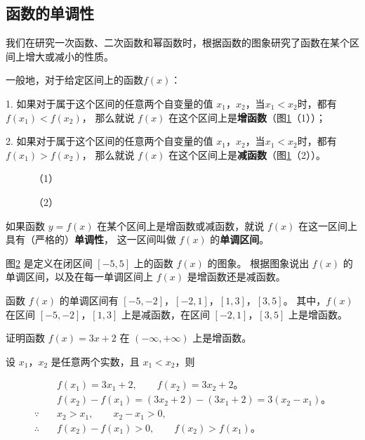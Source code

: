 \subsection{函数的单调性}

我们在研究一次函数、二次函数和幂函数时，根据函数的图象研究了函数在某个区间上增大或减小的性质。

一般地，对于给定区间上的函数$f(x)$：

1. 如果对于属于这个区间的任意两个自变量的值 $x_1$，$x_2$，当$x_1 < x_2$时，都有$f(x_1) < f(x_2)$，
那么就说 $f(x)$ 在这个区间上是\textbf{增函数}（图\ref{fig:1-18}（1））；

2. 如果对于属于这个区间的任意两个自变量的值 $x_1$，$x_2$，当$x_1 < x_2$时，都有$f(x_1) > f(x_2)$，
那么就说 $f(x)$ 在这个区间上是\textbf{减函数}（图\ref{fig:1-18}（2））。

\begin{figure}[htbp]
    \centering
    \begin{minipage}{7cm}
    \centering
    
    \caption*{（1）}
    \end{minipage}
    \qquad
    \begin{minipage}{7cm}
    \centering
    
    \caption*{（2）}
    \end{minipage}
    \caption{}\label{fig:1-18}
\end{figure}

如果函数 $y = f(x)$ 在某个区间上是增函数或减函数，就说 $f(x)$ 在这一区间上具有（严格的）\textbf{单调性}，
这一区间叫做 $f(x)$ 的\textbf{单调区间}。

\liti 图\ref{fig:1-19} 是定义在闭区间 $[-5, 5]$ 上的函数 $f(x)$ 的图象。
根据图象说出 $f(x)$ 的单调区间，以及在每一单调区间上 $f(x)$ 是增函数还是减函数。

\begin{figure}[htbp]
    \centering
    
    \caption{}\label{fig:1-19}
\end{figure}

\jie 函数 $f(x)$ 的单调区间有 $[-5,-2]$，$[-2,1]$，$[1,3]$，$[3,5]$。
其中，$f(x)$ 在区间 $[-5,-2]$，$[1,3]$ 上是减函数，在区间 $[-2,1]$，$[3,5]$ 上是增函数。

\liti 证明函数 $f(x) = 3x + 2$ 在 $(-\infty, +\infty)$ 上是增函数。

\zhengming 设 $x_1$，$x_2$ 是任意两个实数，且 $x_1 < x_2$，则

\begin{minipage}{10cm}
\begin{align*}
    & f(x_1) = 3x_1 + 2, \qquad f(x_2) = 3x_2 + 2 \text{。} \\
    & f(x_2) - f(x_1) = (3x_2 + 2) - (3x_1 + 2) = 3(x_2 - x_1) \text{。} \\
    \because \quad & x_2 > x_1, \qquad x_2 - x_1 > 0, \\
    \therefore \quad & f(x_2) - f(x_1) > 0, \qquad f(x_2) > f(x_1) \text{。}
\end{align*}
\end{minipage}

